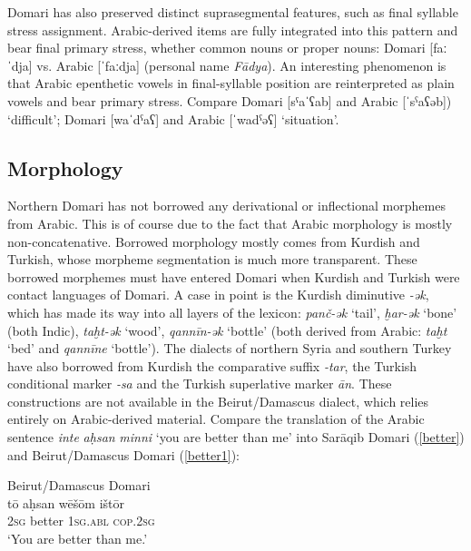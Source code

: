 \documentclass[output=paper]{langsci/langscibook}
\begin{document}
Domari has also preserved distinct suprasegmental features, such as final syllable stress assignment. Arabic-derived items are fully integrated into this pattern and bear final primary stress, whether common nouns or proper nouns: Domari [faːˈdja] vs. Arabic [ˈfaːdja] (personal name \textit{Fādya}). An interesting phenomenon is that Arabic epenthetic vowels in final-syllable position are reinterpreted as plain vowels and bear primary stress.  Compare Domari [sˤaˈʕab] and Arabic [ˈsˁaʕəb]) ‘difficult’; Domari [waˈdˁaʕ] and Arabic [ˈwadˁəʕ] ‘situation’.


 
 \subsection{Morphology}


Northern Domari has not borrowed any derivational or inflectional morphemes from Arabic. This is of course due to the fact that Arabic morphology is mostly non-concatenative. Borrowed morphology mostly comes from Kurdish and Turkish, whose morpheme segmentation is much more transparent. These borrowed morphemes must have entered Domari when Kurdish and Turkish were contact languages of Domari. A case in point is the Kurdish diminutive \textit{-ək}, which has made its way into all layers of the lexicon: \textit{panč-ək} ‘tail’, \textit{ḫar-ək} ‘bone’ (both Indic), \textit{taḫt-ək} ‘wood’, \textit{qannīn-ək} ‘bottle’ (both derived from Arabic: \textit{taḫt} ‘bed’ and \textit{qannīne} ‘bottle’). The dialects of northern Syria and southern Turkey have also borrowed from Kurdish the comparative suffix \textit{{}-tar}, the Turkish conditional marker \textit{{}-sa} and the Turkish superlative marker \textit{ān}. These constructions are not available in the Beirut/Damascus dialect, which relies entirely on Arabic-derived material. Compare the translation of the Arabic sentence \textit{inte} \textit{aḥsan} \textit{minni} ‘you are better than me’ into Sarāqib Domari (\ref{better}) and Beirut/Damascus Domari (\ref{better1}):

\ea 
{Beirut/Damascus Domari}\\ \label{better1}
\gll tō aḥsan wēšōm ištōr\\
 \textsc{2sg} better \textsc{1sg.abl} \textsc{cop.2sg} \\
\glt ‘You are better than me.’\\
\z
\end{document}
